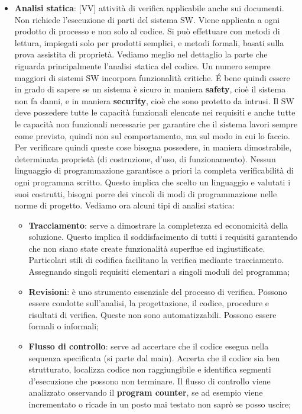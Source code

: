 \begin{itemize}
		\item \textbf{Analisi statica}: [VV] attività di verifica applicabile anche sui documenti. Non richiede l'esecuzione di parti del sistema SW. Viene applicata a ogni prodotto di processo e non solo al codice. Si può effettuare con metodi di lettura, impiegati solo per prodotti semplici, e metodi formali, basati sulla prova assistita di proprietà. Vediamo meglio nel dettaglio la parte che riguarda principalmente l'analisi statica del codice. \newline
		Un numero sempre maggiori di sistemi SW incorpora funzionalità critiche. \'E bene quindi essere in grado di sapere se un sistema è sicuro in maniera \textbf{safety}, cioè il sistema non fa danni, e in maniera \textbf{security}, cioè che sono protetto da intrusi. Il SW deve possedere tutte le capacità funzionali elencate nei requisiti e anche tutte le capacità non funzionali necessarie per garantire che il sistema lavori sempre come previsto, quindi non sul comportamento, ma sul modo in cui lo faccio. Per verificare quindi queste cose bisogna possedere, in maniera dimostrabile, determinata proprietà (di costruzione, d'uso, di funzionamento). \newline
		Nessun linguaggio di programmazione garantisce a priori la completa verificabilità di ogni programma scritto. Questo implica che scelto un linguaggio e valutati i suoi costrutti, bisogni porre dei vincoli di modi di programmazione nelle norme di progetto. Vediamo ora alcuni tipi di analisi statica:
			\begin{itemize}
				\item \textbf{Tracciamento}: serve a dimostrare la completezza ed economicità della soluzione. Questo implica il soddisfacimento di tutti i requisiti garantendo che non siano state create funzionalità superflue ed ingiustificate. Particolari stili di codifica facilitano la verifica mediante tracciamento. Assegnando singoli requisiti elementari a singoli moduli del programma;
				\item \textbf{Revisioni}: è uno strumento essenziale del processo di verifica. Possono essere condotte sull'analisi, la progettazione, il codice, procedure e risultati di verifica. Queste non sono automatizzabili. Possono essere formali o informali;
				\item \textbf{Flusso di controllo}: serve ad accertare che il codice esegua nella sequenza specificata (si parte dal main). Accerta che il codice sia ben strutturato, localizza codice non raggiungibile e identifica segmenti d'esecuzione che possono non terminare. Il flusso di controllo viene analizzato osservando il \textbf{program counter}, se ad esempio viene incrementato o ricade in un posto mai testato non saprò se posso uscire;

\end{itemize}
\end{itemize}
